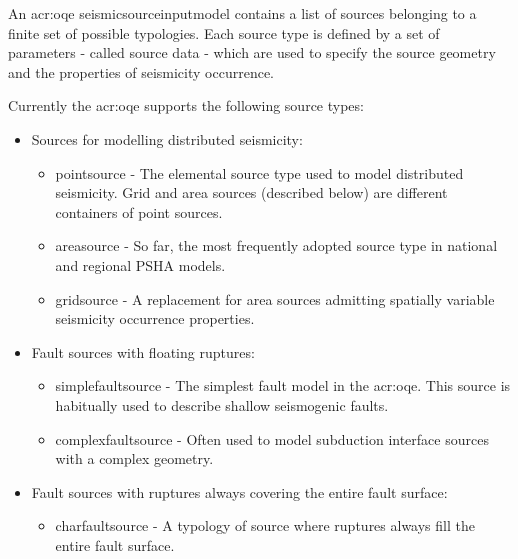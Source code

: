 An \glsdesc{acr:oqe} \gls{seismicsourceinputmodel} contains a list of sources
belonging to a finite set of possible typologies. Each source type is defined
by a set of parameters - called source data - which are used to specify the
source geometry and the properties of seismicity occurrence.

Currently the \glsdesc{acr:oqe} supports the following source types:

\begin{itemize}

    \item Sources for modelling distributed seismicity:

    \begin{itemize}

        \item \Gls{pointsource} - The elemental source type used to model
        distributed seismicity. Grid and area sources (described below) are
        different containers of point sources.

        \item \Gls{areasource} - So far, the most frequently adopted source
        type in national and regional PSHA models.

        \item \Gls{gridsource} - A replacement for area sources admitting
        spatially variable seismicity occurrence properties.

    \end{itemize}

    \item Fault sources with floating ruptures:

    \begin{itemize}

        \item \Gls{simplefaultsource} - The simplest fault model in the
        \glsdesc{acr:oqe}. This source is habitually used to describe shallow
        seismogenic faults.

        \item \Gls{complexfaultsource} - Often used to model subduction
        interface sources with a complex geometry.

    \end{itemize}

    \item Fault sources with ruptures always covering the entire fault surface:

    \begin{itemize}

        \item \Gls{charfaultsource} - A typology of source where ruptures
        always fill the entire fault surface.

    \end{itemize}

\end{itemize}

